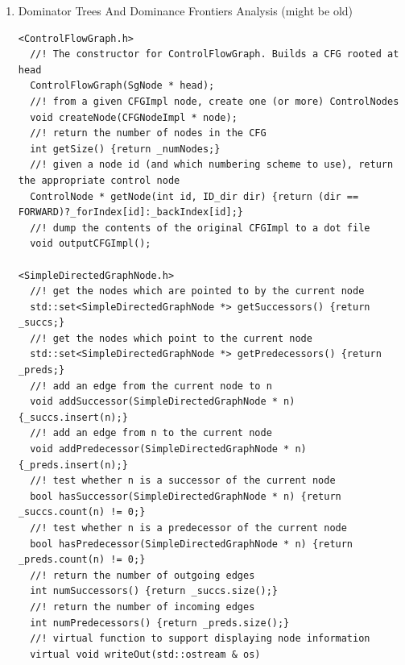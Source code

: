 \begin{enumerate}
\begin{enumerate}
\begin{lstlisting}
  /* ! \class DominanceFrontier
     This class constructs the dominance (or post-dominance) frontiers for
	 all nodes in a ControlFlowGraph. A dominance (post-dominance) frontier
	 for node X is simply the set of nodes such that a given node Y from the 
	 set is not dominated (post-dominated) by X, but there is an immediate
	 predecessor of Y that is dominated (post-dominated) by X.
	 The type of frontier we construct is determined by the DominatorTree
	 that DominanceFrontier is initialized with.
 */
  template < typename CFGFilterFunction > class TemplatedDominanceFrontier:public DominatorForwardBackwardWrapperClass <
  //! retunrs a set of ID's with the nodes dominance-frontier
  std::set<int> getFrontier(int node)
  //! construct the domnancefrontier
  TemplatedDominanceFrontier(TemplatedDominatorTree < CFGFilterFunction > dt):DominatorForwardBackwardWrapperClass < CFGFilterFunction > (dt.getDirection()),
  //! debug method to print forntiers
  void printFrontiers()

      \end{lstlisting}

      \item Dominator Trees And Dominance Frontiers Analysis (might be old)
      \begin{lstlisting}
<ControlFlowGraph.h>
  //! The constructor for ControlFlowGraph. Builds a CFG rooted at head
  ControlFlowGraph(SgNode * head);
  //! from a given CFGImpl node, create one (or more) ControlNodes
  void createNode(CFGNodeImpl * node);
  //! return the number of nodes in the CFG
  int getSize() {return _numNodes;}
  //! given a node id (and which numbering scheme to use), return the appropriate control node
  ControlNode * getNode(int id, ID_dir dir) {return (dir == FORWARD)?_forIndex[id]:_backIndex[id];}
  //! dump the contents of the original CFGImpl to a dot file
  void outputCFGImpl();

<SimpleDirectedGraphNode.h>
  //! get the nodes which are pointed to by the current node
  std::set<SimpleDirectedGraphNode *> getSuccessors() {return _succs;}
  //! get the nodes which point to the current node
  std::set<SimpleDirectedGraphNode *> getPredecessors() {return _preds;}
  //! add an edge from the current node to n
  void addSuccessor(SimpleDirectedGraphNode * n) {_succs.insert(n);}
  //! add an edge from n to the current node
  void addPredecessor(SimpleDirectedGraphNode * n) {_preds.insert(n);}
  //! test whether n is a successor of the current node
  bool hasSuccessor(SimpleDirectedGraphNode * n) {return _succs.count(n) != 0;}
  //! test whether n is a predecessor of the current node
  bool hasPredecessor(SimpleDirectedGraphNode * n) {return _preds.count(n) != 0;}
  //! return the number of outgoing edges
  int numSuccessors() {return _succs.size();}
  //! return the number of incoming edges
  int numPredecessors() {return _preds.size();}
  //! virtual function to support displaying node information
  virtual void writeOut(std::ostream & os)


\end{lstlisting}
\end{enumerate}
\end{enumerate}
